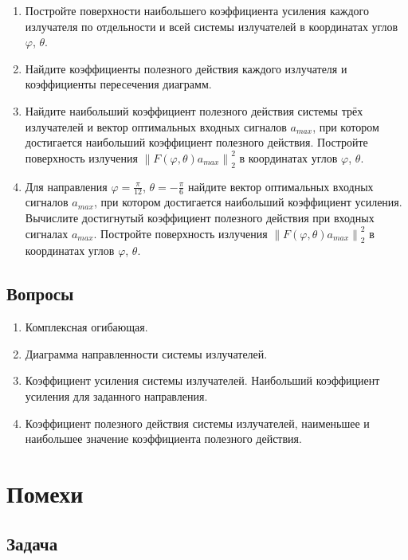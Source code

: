 \documentclass[a4paper,12pt]{article}
\newcommand{\snorm}[1]{\left\| #1 \right\|_2}
\begin{document}
\begin{enumerate}
    \item Постройте поверхности наибольшего коэффициента усиления каждого излучателя по отдельности и всей системы излучателей
          в координатах углов $\varphi$, $\theta$.
    \item Найдите коэффициенты полезного действия каждого излучателя и коэффициенты пересечения диаграмм.
    \item Найдите наибольший коэффициент полезного действия системы трёх излучателей и вектор оптимальных входных сигналов $a_{max}$,
          при котором достигается наибольший коэффициент полезного действия. Постройте поверхность излучения $\snorm{F(\varphi, \theta) a_{max}}^2$
          в координатах углов $\varphi$, $\theta$.
    \item Для направления $\varphi = \frac{\pi}{12}$, $\theta = -\frac{\pi}{6}$ найдите вектор оптимальных входных сигналов $a_{max}$,
          при котором достигается наибольший коэффициент усиления. Вычислите достигнутый коэффициент полезного действия при входных сигналах $a_{max}$.
          Постройте поверхность излучения $\snorm{F(\varphi, \theta) a_{max}}^2$ в координатах углов $\varphi$, $\theta$.
\end{enumerate}

\subsection{Вопросы}

\begin{enumerate}
    \item Комплексная огибающая.
    \item Диаграмма направленности системы излучателей.
    \item Коэффициент усиления системы излучателей. Наибольший коэффициент усиления для заданного направления.
    \item Коэффициент полезного действия системы излучателей, наименьшее и наибольшее значение коэффициента полезного действия.
\end{enumerate}

\section{Помехи}

\subsection{Задача}
\end{document}
